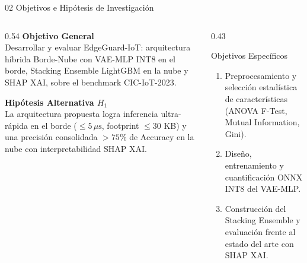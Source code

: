 \documentclass[aspectratio=169, 10pt]{beamer}
\begin{document}
\begin{frame}{02 \quad Objetivos e Hipótesis de Investigación}
  \begin{columns}[T]
    \begin{column}{0.54\textwidth}
      \textbf{Objetivo General}\\[4pt]
      \textcolor{textmuted}{\small Desarrollar y evaluar EdgeGuard-IoT: arquitectura
      híbrida Borde-Nube con VAE-MLP INT8 en el borde, Stacking Ensemble
      LightGBM en la nube y SHAP XAI, sobre el benchmark CIC-IoT-2023.}

      \vspace{10pt}
      \textbf{Hipótesis Alternativa $H_1$}\\[4pt]
      \textcolor{textmuted}{\small La arquitectura propuesta logra inferencia ultra-rápida
      en el borde ($\leq 5\,\mu\text{s}$, footprint $\leq 30$ KB) y una precisión consolidada
      $> 75\%$ de Accuracy en la nube con interpretabilidad SHAP XAI.}
    \end{column}

    \begin{column}{0.43\textwidth}
      \begin{block}{Objetivos Específicos}
        \begin{enumerate}\footnotesize
          \item Preprocesamiento y selección estadística de características\\
                (ANOVA F-Test, Mutual Information, Gini).
          \item Diseño, entrenamiento y cuantificación ONNX INT8 del VAE-MLP.
          \item Construcción del Stacking Ensemble y evaluación frente
                al estado del arte con SHAP XAI.
        \end{enumerate}
      \end{block}
    \end{column}
  \end{columns}
\end{frame}
\end{document}
